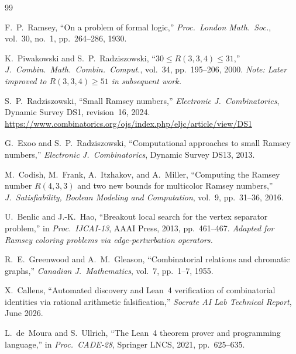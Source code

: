 \documentclass[11pt,a4paper]{article}
\theoremstyle{definition}
\theoremstyle{remark}
\begin{document}
\begin{thebibliography}{99}

F.~P.~Ramsey,
``On a problem of formal logic,''
\emph{Proc.\ London Math.\ Soc.}, vol.~30, no.~1, pp.~264--286, 1930.

K.~Piwakowski and S.~P.~Radziszowski,
``$30 \le R(3,3,4) \le 31$,''
\emph{J.\ Combin.\ Math.\ Combin.\ Comput.}, vol.~34, pp.~195--206, 2000.
\textit{Note: Later improved to $R(3,3,4) \ge 51$ in subsequent work.}

S.~P.~Radziszowski,
``Small Ramsey numbers,''
\emph{Electronic J.\ Combinatorics}, Dynamic Survey DS1, revision~16, 2024.
\url{https://www.combinatorics.org/ojs/index.php/eljc/article/view/DS1}

G.~Exoo and S.~P.~Radziszowski,
``Computational approaches to small Ramsey numbers,''
\emph{Electronic J.\ Combinatorics}, Dynamic Survey DS13, 2013.

M.~Codish, M.~Frank, A.~Itzhakov, and A.~Miller,
``Computing the Ramsey number $R(4,3,3)$ and
two new bounds for multicolor Ramsey numbers,''
\emph{J.\ Satisfiability, Boolean Modeling and Computation},
vol.~9, pp.~31--36, 2016.

U.~Benlic and J.-K.~Hao,
``Breakout local search for the vertex separator problem,''
in \emph{Proc.\ IJCAI-13}, AAAI Press, 2013, pp.~461--467.
\textit{Adapted for Ramsey coloring problems via edge-perturbation
operators.}

R.~E.~Greenwood and A.~M.~Gleason,
``Combinatorial relations and chromatic graphs,''
\emph{Canadian J.\ Mathematics}, vol.~7, pp.~1--7, 1955.

X.~Callens,
``Automated discovery and Lean~4 verification of combinatorial
identities via rational arithmetic falsification,''
\emph{Socrate AI Lab Technical Report}, June 2026.

L.~de~Moura and S.~Ullrich,
``The Lean~4 theorem prover and programming language,''
in \emph{Proc.\ CADE-28}, Springer LNCS, 2021, pp.~625--635.

\end{thebibliography}
\end{document}
